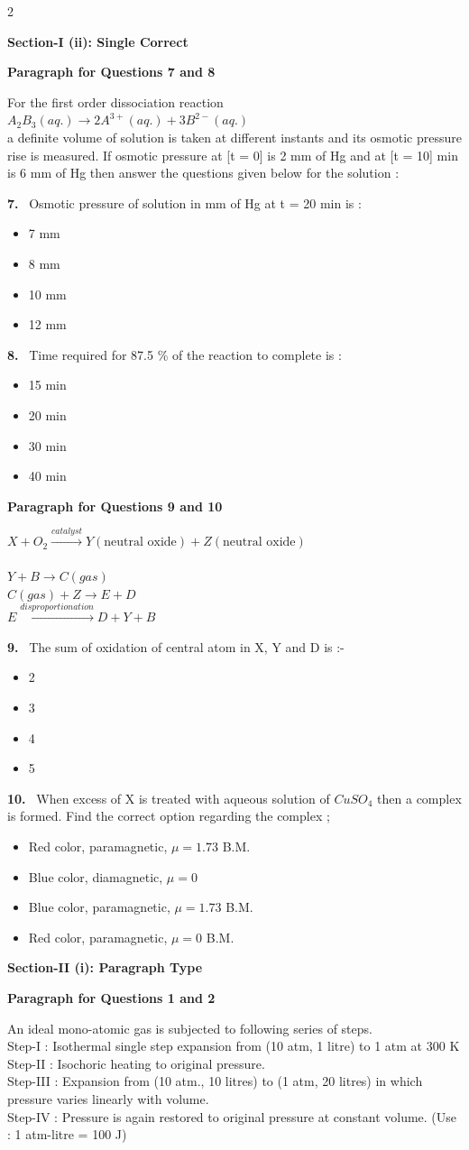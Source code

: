 \documentclass[10pt]{extarticle}
\newcommand{\sect}[1]{\par\smallskip\noindent\textbf{#1}\par}
\newcommand{\qn}[1]{\par\smallskip\noindent\textbf{#1.}~}
\newcommand{\paraq}[2]{\par\smallskip\noindent\textbf{Paragraph for Questions #1 and #2}\par}
\newenvironment{qoptions}{\begin{itemize}[leftmargin=1.8em,itemsep=1pt,topsep=2pt,label={}]}{\end{itemize}}
\newcommand{\opt}[2]{\item[(#1)] #2}
\begin{document}
\begin{multicols}{2}
\sect{Section-I (ii): Single Correct}

\paraq{7}{8}
For the first order dissociation reaction\\
$A_2B_3(aq.)\longrightarrow2A^{3+}(aq.)+3B^{2-}(aq.)$\\
a definite volume of solution is taken at different instants and its osmotic pressure rise is measured. If osmotic pressure at [t = 0] is 2 mm of Hg and at [t = 10] min is 6 mm of Hg then answer the questions given below for the solution :\\

\qn{7} Osmotic pressure of solution in mm of Hg at t = 20 min is :
\begin{qoptions}
\opt{A}{7 mm}
\opt{B}{8 mm}
\opt{C}{10 mm}
\opt{D}{12 mm}
\end{qoptions}

\qn{8} Time required for 87.5 \% of the reaction to complete is :
\begin{qoptions}
\opt{A}{15 min}
\opt{B}{20 min}
\opt{C}{30 min}
\opt{D}{40 min}
\end{qoptions}

\paraq{9}{10}
$X+O_2\xrightarrow{catalyst}Y(\text{neutral oxide})+Z(\text{neutral oxide})$\\
\\
$Y+B\longrightarrow C(gas)$\\
$C(gas)+Z\longrightarrow E+D$\\
$E\xrightarrow{disproportionation}D+Y+B$

\qn{9} The sum of oxidation of central atom in X, Y and D is :-
\begin{qoptions}
\opt{A}{2}
\opt{B}{3}
\opt{C}{4}
\opt{D}{5}
\end{qoptions}

\qn{10} When excess of X is treated with aqueous solution of $CuSO_4$ then a complex is formed. Find the correct option regarding the complex ;
\begin{qoptions}
\opt{A}{Red color, paramagnetic, $\mu=1.73$ B.M.}
\opt{B}{Blue color, diamagnetic, $\mu=0$}
\opt{C}{Blue color, paramagnetic, $\mu=1.73$ B.M.}
\opt{D}{Red color, paramagnetic, $\mu=0$ B.M.}
\end{qoptions}

\sect{Section-II (i): Paragraph Type}

\paraq{1}{2}
An ideal mono-atomic gas is subjected to following series of steps.\\
Step-I : Isothermal single step expansion from (10 atm, 1 litre) to 1 atm at 300 K\\
Step-II : Isochoric heating to original pressure.\\
Step-III : Expansion from (10 atm., 10 litres) to (1 atm, 20 litres) in which pressure varies linearly with volume.\\
Step-IV : Pressure is again restored to original pressure at constant volume. (Use : 1 atm-litre = 100 J)


\end{multicols}
\end{document}
